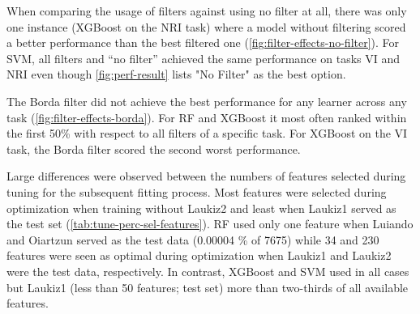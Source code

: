 \documentclass[letterpaper, peerreview, draftcls]{IEEEtran}
\begin{document}
When comparing the usage of filters against using no filter at all, there was only one instance (XGBoost on the NRI task) where a model without filtering scored a better performance than the best filtered one (\autoref{fig:filter-effects-no-filter}).
For SVM, all filters and \enquote{no filter} achieved the same performance on tasks VI and NRI even though \autoref{fig:perf-result} lists "No Filter" as the best option.

The Borda filter did not achieve the best performance for any learner across any task (\autoref{fig:filter-effects-borda}).
For RF and XGBoost it most often ranked within the first 50\% with respect to all filters of a specific task.
For XGBoost on the VI task, the Borda filter scored the second worst performance.

Large differences were observed between the numbers of features selected during tuning for the subsequent fitting process.
Most features were selected during optimization when training without Laukiz2 and least when Laukiz1 served as the test set (\autoref{tab:tune-perc-sel-features}).
RF used only one feature when Luiando and Oiartzun served as the test data (0.00004 \% of 7675) while 34 and 230 features were seen as optimal during optimization when Laukiz1 and Laukiz2 were the test data, respectively.
In contrast, XGBoost and SVM used in all cases but Laukiz1 (less than 50 features; test set) more than two-thirds of all available features.










\end{document}
